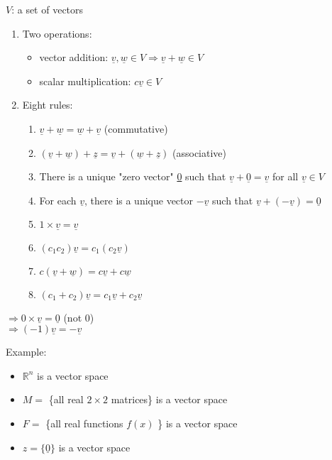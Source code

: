 \documentclass[12pt,a4paper]{article}
\begin{document}
$V$: a set of vectors
\begin{enumerate}
  \item Two operations:
  \begin{itemize}
    \item vector addition: $\underline{v}, \underline{w} \in V \Rightarrow \underline{v} + \underline{w} \in V$
    \item scalar multiplication: $c \underline{v} \in V$
  \end{itemize}
  \item Eight rules:
  \begin{enumerate}
    \item $\underline{v} + \underline{w} = \underline{w} + \underline{v}$ (commutative)
    \item $(\underline{v} + \underline{w}) + \underline{z} = \underline{v} + (\underline{w} + \underline{z})$ (associative)
    \item There is a unique "zero vector" \underline{0} such that $\underline{v} + \underline{0} = \underline{v}$ for all $\underline{v} \in V$
    \item For each $\underline{v}$, there is a unique vector $-\underline{v}$ such that $\underline{v} + (-\underline{v}) = \underline{0}$
    \item $1 \times \underline{v} = \underline{v}$
    \item $(c_1c_2)\underline{v} = c_1(c_2\underline{v})$
    \item $c(\underline{v} + \underline{w}) = c\underline{v} + c\underline{w}$
    \item $(c_1 + c_2)\underline{v} = c_1\underline{v} + c_2\underline{v}$
  \end{enumerate}
\end{enumerate}

$\Rightarrow 0 \times \underline{v}  = \underline{0}$  (not 0) \\
$\Rightarrow (-1)\underline{v} = -\underline{v}$

Example:

\begin{itemize}
  \item $\mathbb{R}^n$ is a vector space
  \item $M =$ \{all real $2 \times 2$ matrices\} is a vector space
  \item $F =$ \{all real functions $f(x)$ \} is a vector space
  \item $z = \{ \underline{0} \}$ is a vector space
\end{itemize}
\end{document}
